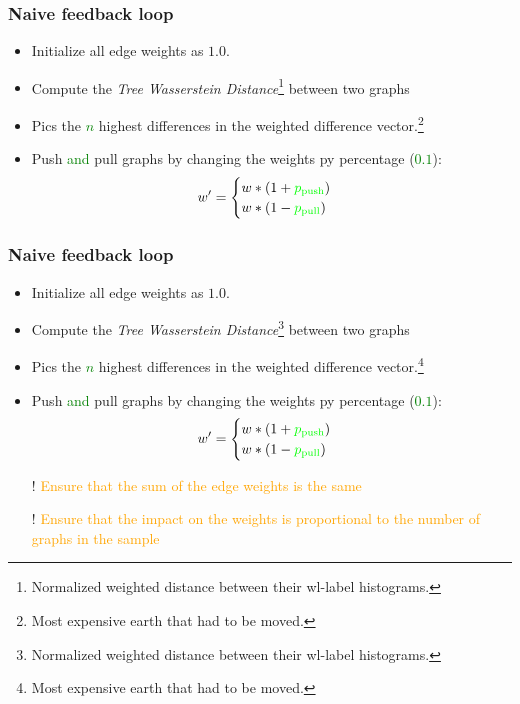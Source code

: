 \begin{frame}
\frametitle{Naive feedback loop}
	\begin{itemize}
		\item Initialize all edge weights as $1.0$.
		\item Compute the \textit{Tree Wasserstein Distance}\footnote{Normalized weighted distance between their wl-label histograms.} between two graphs
		\item Pics the \textcolor{green}{$n$} highest differences in the weighted difference vector.\footnote{Most expensive earth that had to be moved.}
		\item Push \textcolor{green}{and} pull graphs by changing the weights py percentage (\textcolor{green}{$0.1$}):
		\[ w^\prime  =\begin{cases}
		w * (1 + \textcolor{green}{p_{\text{push}}} )\\
		w * (1 - \textcolor{green}{p_{\text{pull}}} )
		\end{cases}  \] 
		\item[] 
		\item[] 
		\item[] 
		\item[]
	\end{itemize}
\end{frame}

\begin{frame}[noframenumbering]
	\frametitle{Naive feedback loop}
	\begin{itemize}
		\item Initialize all edge weights as $1.0$.
		\item Compute the \textit{Tree Wasserstein Distance}\footnote{Normalized weighted distance between their wl-label histograms.} between two graphs
		\item Pics the \textcolor{green}{$n$} highest differences in the weighted difference vector.\footnote{Most expensive earth that had to be moved.}
		\item Push \textcolor{green}{and} pull graphs by changing the weights py percentage (\textcolor{green}{$0.1$}):
		\[ w^\prime  =\begin{cases}
		w * (1 + \textcolor{green}{p_{\text{push}}} )\\
		w * (1 - \textcolor{green}{p_{\text{pull}}} )
		\end{cases}  \] 
		\item[]
		\item[!] \textcolor{orange}{Ensure that the sum of the edge weights is the same}
		\item[!] \textcolor{orange}{Ensure that the impact on the weights is proportional to the number of graphs in the sample}
	\end{itemize}
\end{frame}

